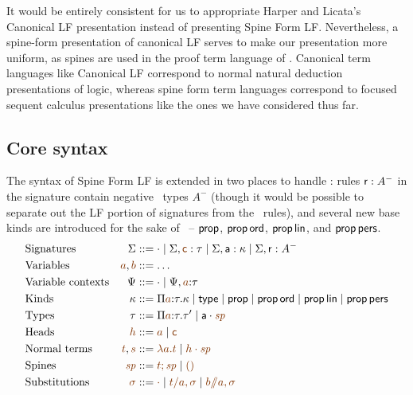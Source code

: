 It would be entirely consistent for us to appropriate Harper and
Licata's Canonical LF presentation instead of presenting Spine Form
LF. Nevertheless, a spine-form presentation of canonical LF serves to
make our presentation more uniform, as spines are used in the proof
term language of \sls. Canonical term languages like Canonical LF
correspond to normal natural deduction presentations of logic, whereas
spine form term languages correspond to focused sequent calculus
presentations like the ones we have considered thus far.

\subsection{Core syntax}

The syntax of Spine Form LF is extended in two places to handle \sls:
rules ${\sf r} : A^-$ in the signature contain negative \sls~types
$A^-$ (though it would be possible to separate out the LF portion of
signatures from the \sls~rules), and several new base kinds
are introduced for the sake of \sls~-- ${\sf prop}$, ${\sf prop}\,{\sf
  ord}$, ${\sf prop}\,{\sf lin}$, and ${\sf prop}\,{\sf pers}$.
\begin{align*}
& \mbox{Signatures} & \Sigma & ::= \cdot 
  \mid \Sigma, \lf{\sf c} : \tau
  \mid \Sigma, {\sf a} : \kappa
  \mid \Sigma, {\sf r} : A^-
\\
& \mbox{Variables} & \lf{a}, \lf{b} & ::= \ldots
\\
& \mbox{Variable contexts} & \Psi & ::= \cdot
  \mid \Psi, \lf{a} {:} \tau 
\\
& \mbox{Kinds} & \kappa & ::=  \lfpi{a}{\tau}{\kappa} 
  \mid {\sf type}
  \mid {\sf prop}
  \mid {\sf prop}\,{\sf ord}
  \mid {\sf prop}\,{\sf lin}
  \mid {\sf prop}\,{\sf pers}
\\
& \mbox{Types} & \tau & ::= \lfpi{a}{\tau}{\tau'} 
  \mid \lfroot{\sf a}{\spi}
\\
& \mbox{Heads} & \lf{h} & ::= \lf{a} \mid \lf{\sf c}
\\
& \mbox{Normal terms} & \lf{t}, \lf{s} & ::= \lf{\lambda a.t}
  \mid \lf{\lfroot{h}{\spi}}
\\
& \mbox{Spines} & \lf{\spi} & ::= \lf{t; \spi} \mid \lf{\lfnil}
\\
& \mbox{Substitutions} & \lf{\sigma} & ::= \lf{\cdot}
  \mid \lf{t/a, \sigma}
  \mid \lf{b/\!\!/a, \sigma}
\end{align*}
